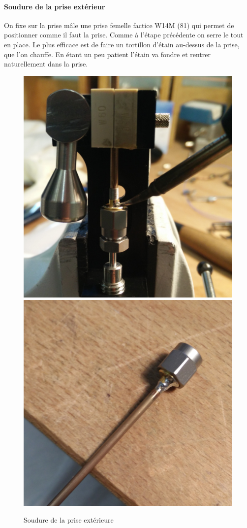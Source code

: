 \documentclass[a4paper,11pt]{report}
\begin{document}
\paragraph*{Soudure de la prise extérieur} On fixe sur la prise mâle une prise femelle factice W14M
(81) qui permet de positionner comme il faut la prise. Comme à l’étape précédente on
serre le tout en place.
Le plus efficace est de faire un tortillon d’étain au-dessus de la prise, que l’on chauffe. En
étant un peu patient l’étain va fondre et rentrer naturellement dans la prise.
\begin{figure}[h]
    \begin{center}
        \includegraphics[height=0.48\textwidth]{Images/Coax/4}
        \quad
        \includegraphics[height=0.48\textwidth]{Images/Coax/5}
        \caption{Soudure de la prise extérieure}
        \label{fig:}
    \end{center}
\end{figure}
\end{document}
